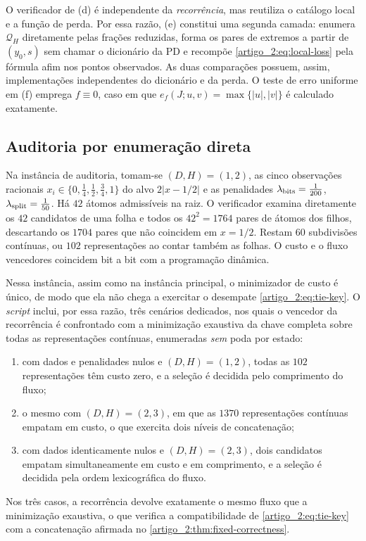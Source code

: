 \documentclass[12pt,a4paper]{article}
\theoremstyle{preciso}
\theoremstyle{definition}
\theoremstyle{preciso}
\theoremstyle{preciso}
\theoremstyle{preciso}
\theoremstyle{preciso}
\theoremstyle{definition}
\theoremstyle{preciso}
\theoremstyle{definition}
\theoremstyle{preciso}
\theoremstyle{preciso}
\theoremstyle{definition}
\begin{document}
O verificador de (d) é independente da \emph{recorrência}, mas reutiliza o
catálogo local e a função de perda. Por essa razão, (e) constitui uma segunda camada:
enumera $\mathcal Q_H$ diretamente pelas frações reduzidas, forma os pares
de extremos a partir de $(y_0,s)$ sem chamar o dicionário da PD e recompõe
\eqref{artigo_2:eq:local-loss} pela fórmula afim nos pontos observados. As duas
comparações possuem, assim, implementações independentes do dicionário e da
perda. O teste de erro uniforme em (f) emprega $f\equiv0$, caso em que
$e_f(J;u,v)=\max\{|u|,|v|\}$ é calculado exatamente.

\subsection{Auditoria por enumeração direta}

Na instância de auditoria, tomam-se $(D,H)=(1,2)$, as cinco observações
racionais $x_i\in\{0,\tfrac14,\tfrac12,\tfrac34,1\}$ do alvo $2|x-1/2|$ e as
penalidades $\lambda_{\rm bits}=\tfrac1{200}$,
$\lambda_{\rm split}=\tfrac1{50}$. Há $42$ átomos admissíveis na
raiz. O verificador examina diretamente os $42$ candidatos de uma folha e
todos os $42^2=1764$ pares de átomos dos filhos, descartando os $1704$ pares
que não coincidem em $x=1/2$. Restam $60$ subdivisões contínuas, ou $102$
representações ao contar também as folhas. O custo e o fluxo vencedores
coincidem bit a bit com a programação dinâmica.

Nessa instância, assim como na instância principal, o minimizador de custo é único,
de modo que ela não chega a exercitar o desempate \eqref{artigo_2:eq:tie-key}. O \emph{script}
inclui, por essa razão, três cenários dedicados, nos quais o vencedor da recorrência é
confrontado com a minimização exaustiva da chave completa sobre todas as
representações contínuas, enumeradas \emph{sem} poda por estado:
\begin{enumerate}[label=(\alph*),leftmargin=2em]
 \item com dados e penalidades nulos e $(D,H)=(1,2)$, todas as $102$
 representações têm custo zero, e a seleção é decidida pelo comprimento do
 fluxo;
 \item o mesmo com $(D,H)=(2,3)$, em que as $1370$ representações contínuas
 empatam em custo, o que exercita dois níveis de concatenação;
 \item com dados identicamente nulos e $(D,H)=(2,3)$, dois candidatos empatam
 simultaneamente em custo e em comprimento, e a seleção é decidida pela ordem
 lexicográfica do fluxo.
\end{enumerate}
Nos três casos, a recorrência devolve exatamente o mesmo fluxo que a
minimização exaustiva, o que verifica a compatibilidade de \eqref{artigo_2:eq:tie-key}
com a concatenação afirmada no \cref{artigo_2:thm:fixed-correctness}.
\end{document}
